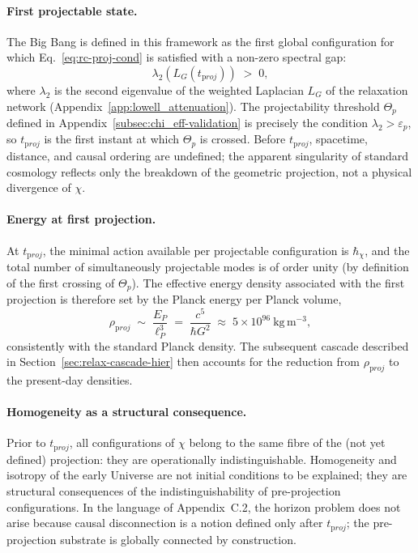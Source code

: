     \paragraph{First projectable state.}
      The Big Bang is defined in this framework as the first global
      configuration for which Eq.~\eqref{eq:rc-proj-cond} is satisfied with
      a non-zero spectral gap:
    \begin{equation}
      \label{eq:rc-firstproj}
      \lambda_2\!\left(L_G(t_{\mathrm proj})\right) \;>\; 0,
      \end{equation}
      where $\lambda_2$ is the second eigenvalue of the weighted Laplacian
      $L_G$ of the relaxation network (Appendix~\ref{app:lowell_attenuation}).
      The projectability threshold $\Theta_p$ defined in Appendix~\ref{subsec:chi_eff-validation} is
      precisely the condition $\lambda_2 > \varepsilon_p$, so
      $t_{\mathrm proj}$ is the first instant at which $\Theta_p$ is crossed.
      Before $t_{\mathrm proj}$, spacetime, distance, and causal ordering are
      undefined; the apparent singularity of standard cosmology reflects
      only the breakdown of the geometric projection, not a physical
      divergence of $\chi$.

    \paragraph{Energy at first projection.}
      At $t_{\mathrm proj}$, the minimal action available per projectable
      configuration is $\hbar_\chi$, and the total number of simultaneously
      projectable modes is of order unity (by definition of the first crossing of $\Theta_p$).
      The effective energy density associated with the first projection is
      therefore set by the Planck energy per Planck volume,
    \begin{equation}
      \label{eq:rc-rho-planck}
      \rho_{\mathrm proj}
      \;\sim\; \frac{E_P}{\ell_P^3}
      \;=\; \frac{c^5}{\hbar G^2}
      \;\approx\; 5 \times 10^{96}~\mathrm{kg\,m^{-3}},
      \end{equation}
      consistently with the standard Planck density.
      The subsequent cascade described in Section~\ref{sec:relax-cascade-hier}
      then accounts for the reduction from $\rho_{\mathrm proj}$ to the present-day densities.

    \paragraph{Homogeneity as a structural consequence.}
      Prior to $t_{\mathrm proj}$, all configurations of $\chi$ belong to the
      same fibre of the (not yet defined) projection: they are operationally indistinguishable.
      Homogeneity and isotropy of the early Universe are not initial
      conditions to be explained; they are structural consequences of the
      indistinguishability of pre-projection configurations.
      In the language of Appendix~C.2, the horizon problem does not arise
      because causal disconnection is a notion defined only after
      $t_{\mathrm proj}$; the pre-projection substrate is globally connected by construction.

